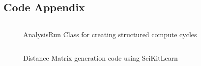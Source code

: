\begin{appendices}
    \chapter{Code Appendix}\label{apndx:code}
    \begin{figure}[ht]
        \inputminted[fontsize=\small]{python}{./code_snippets/appendix/AnalysisRun.py}
        \caption{AnalysisRun Class for creating structured compute cycles}\label{apcode:AnalysisRun.py}
    \end{figure}

    \begin{figure}[ht]
        \inputminted[fontsize=\small]{python}{./code_snippets/appendix/dist_matrix.py}
        \caption{Distance Matrix generation code using SciKitLearn}\label{apcode:dist_matrix.py}
    \end{figure}


\end{appendices}
